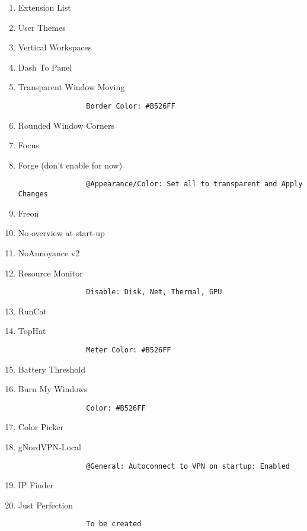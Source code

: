 \documentclass[12pt]{article}
\begin{document}
        \begin{enumerate}
            \item Extension List
            \item User Themes
            \item Vertical Workspaces
            \item Dash To Panel
            \item Transparent Window Moving
            \begin{verbatim}
                Border Color: #B526FF
            \end{verbatim}
            \item Rounded Window Corners
            \item Focus
            \item Forge (don't enable for now)
            \begin{verbatim}
                @Appearance/Color: Set all to transparent and Apply Changes
            \end{verbatim}
            \item Freon
            \item No overview at start-up
            \item NoAnnoyance v2
            \item Resource Monitor
            \begin{verbatim}
                Disable: Disk, Net, Thermal, GPU
            \end{verbatim}
            \item RunCat
            \item TopHat
            \begin{verbatim}
                Meter Color: #B526FF
            \end{verbatim}
            \item Battery Threshold
            \item Burn My Windows
            \begin{verbatim}
                Color: #B526FF
            \end{verbatim}
            \item Color Picker
            \item gNordVPN-Local
            \begin{verbatim}
                @General: Autoconnect to VPN on startup: Enabled
            \end{verbatim}
            \item IP Finder
            \item Just Perfection
            \begin{verbatim}
                To be created
            \end{verbatim}
        \end{enumerate}
\end{document}
